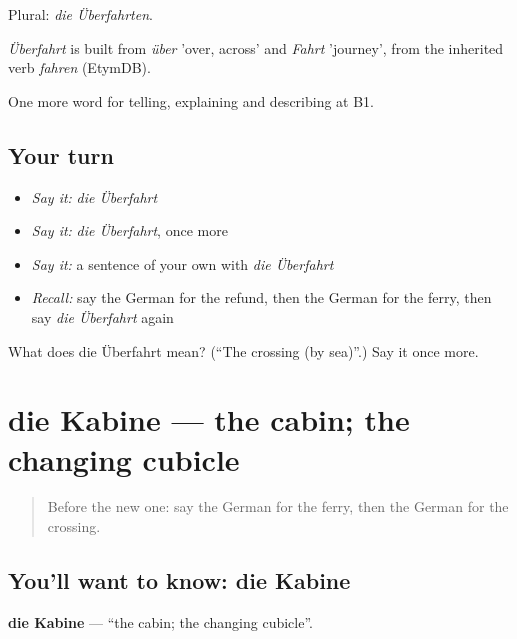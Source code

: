 Plural: \emph{die Überfahrten}.

\begin{cousinweb}
\emph{Überfahrt} is built from \emph{über} 'over, across' and \emph{Fahrt} 'journey', from the inherited verb \emph{fahren} (EtymDB).
\end{cousinweb}

\begin{grammarlens}[title={What you've built}]
One more word for telling, explaining and describing at B1.
\end{grammarlens}

\subsection*{Your turn}
\begin{itemize}
\raggedright
  \item \emph{Say it:} \emph{die Überfahrt}
  \item \emph{Say it:} \emph{die Überfahrt}, once more
  \item \emph{Say it:} a sentence of your own with \emph{die Überfahrt}
  \item \emph{Recall:} say the German for the refund, then the German for the ferry, then say \emph{die Überfahrt} again
\end{itemize}

\begin{tcolorbox}[breakable,colback=teal!4,colframe=teal!35!black,title={Before you move on}]
What does die Überfahrt mean? (\textquotedblleft{}The crossing (by sea)\textquotedblright{}.) Say it once more.
\end{tcolorbox}
\section[die Kabine]{die Kabine — the cabin; the changing cubicle}

\label{lesson:GE-C421-kabine}



\begin{quote}
Before the new one: say the German for the ferry, then the German for the crossing.
\end{quote}

\subsection*{You'll want to know: die Kabine}
\textbf{die Kabine} — \textquotedblleft{}the cabin; the changing cubicle\textquotedblright{}.

